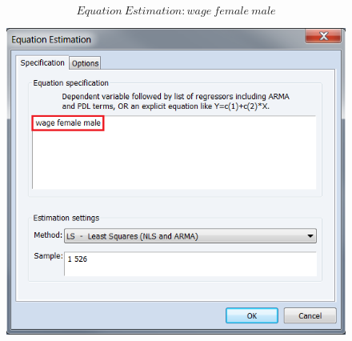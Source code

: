\documentclass[12pt]{report}
\begin{document}
\vspace{-\baselineskip}
$$Equation\ Estimation: wage\ female\ male$$
\begin{figure}[H]
	\centering
	\includegraphics{q2_5}
\end{figure}
\vspace{-\baselineskip}
\end{document}
